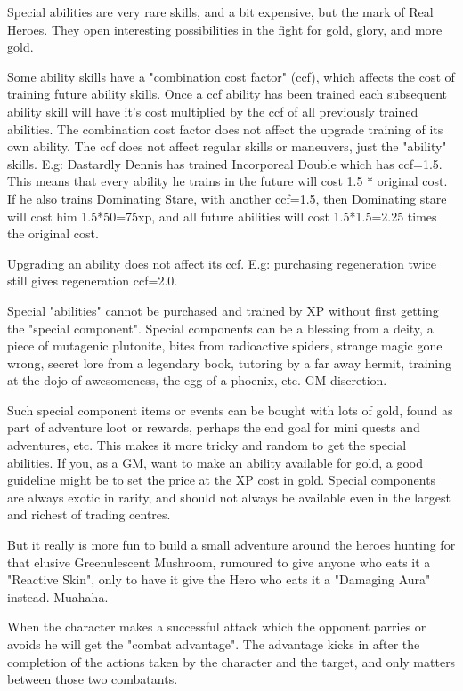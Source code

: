 Special abilities are very rare skills, and a bit expensive, but the mark of Real Heroes. They open interesting possibilities in the fight for gold, glory, and more gold.

Some ability skills have a "combination cost factor" (ccf), which affects the cost of training future ability skills. Once a ccf ability has been trained each subsequent ability skill will have it's cost multiplied by the ccf of all previously trained abilities. The combination cost factor does not affect the upgrade training of its own ability. The ccf does not affect regular skills or maneuvers, just the "ability" skills. 
E.g: Dastardly Dennis has trained Incorporeal Double which has ccf=1.5. This means that every ability he trains in the future will cost 1.5 * original cost. If he also trains Dominating Stare, with another ccf=1.5, then Dominating stare will cost him 1.5*50=75xp, and all future abilities will cost 1.5*1.5=2.25 times the original cost.

Upgrading an ability does not affect its ccf. E.g: purchasing regeneration twice still gives regeneration ccf=2.0.

Special "abilities" cannot be purchased and trained by XP without first getting the "special component". Special components can be a blessing from a deity, a piece of mutagenic plutonite, bites from radioactive spiders, strange magic gone wrong, secret lore from a legendary book, tutoring by a far away hermit, training at the dojo of awesomeness, the egg of a phoenix, etc. GM discretion.

Such special component items or events can be bought with lots of gold, found as part of adventure loot or rewards, perhaps the end goal for mini quests and adventures, etc. This makes it more tricky and random to get the special abilities. If you, as a GM, want to make an ability available for gold, a good guideline might be to set the price at the XP cost in gold. Special components are always exotic in rarity, and should not always be available even in the largest and richest of trading centres.

But it really is more fun to build a small adventure around the heroes hunting for that elusive Greenulescent Mushroom, rumoured to give anyone who eats it a "Reactive Skin", only to have it give the Hero who eats it a "Damaging Aura" instead. Muahaha.


\openskillslist

 When the character makes a successful attack which the opponent parries or avoids he will get the "combat advantage". The advantage kicks in after the completion of the actions taken by the character and the target, and only matters between those two combatants.

